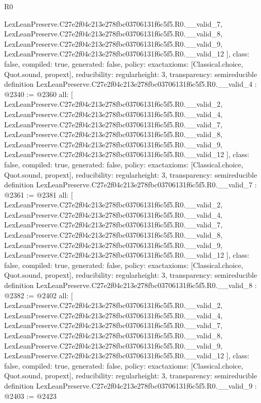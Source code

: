 \begin{lexlean}{R0}
\begin{coremodule}
{    LexLeanPreserve.C27e2f04c213e278fbc03706131f6c5f5.R0.__valid_7,
    LexLeanPreserve.C27e2f04c213e278fbc03706131f6c5f5.R0.__valid_8,
    LexLeanPreserve.C27e2f04c213e278fbc03706131f6c5f5.R0.__valid_9,
    LexLeanPreserve.C27e2f04c213e278fbc03706131f6c5f5.R0.__valid_12
  ],
  class: false,
  compiled: true,
  generated: false,
  policy: exact{axioms: [Classical.choice, Quot.sound, propext]},
  reducibility: regular{height: 3},
  transparency: semireducible
}
definition LexLeanPreserve.C27e2f04c213e278fbc03706131f6c5f5.R0.__valid_4 : @2340 := @2360 {
  all: [
    LexLeanPreserve.C27e2f04c213e278fbc03706131f6c5f5.R0.__valid_2,
    LexLeanPreserve.C27e2f04c213e278fbc03706131f6c5f5.R0.__valid_4,
    LexLeanPreserve.C27e2f04c213e278fbc03706131f6c5f5.R0.__valid_7,
    LexLeanPreserve.C27e2f04c213e278fbc03706131f6c5f5.R0.__valid_8,
    LexLeanPreserve.C27e2f04c213e278fbc03706131f6c5f5.R0.__valid_9,
    LexLeanPreserve.C27e2f04c213e278fbc03706131f6c5f5.R0.__valid_12
  ],
  class: false,
  compiled: true,
  generated: false,
  policy: exact{axioms: [Classical.choice, Quot.sound, propext]},
  reducibility: regular{height: 3},
  transparency: semireducible
}
definition LexLeanPreserve.C27e2f04c213e278fbc03706131f6c5f5.R0.__valid_7 : @2361 := @2381 {
  all: [
    LexLeanPreserve.C27e2f04c213e278fbc03706131f6c5f5.R0.__valid_2,
    LexLeanPreserve.C27e2f04c213e278fbc03706131f6c5f5.R0.__valid_4,
    LexLeanPreserve.C27e2f04c213e278fbc03706131f6c5f5.R0.__valid_7,
    LexLeanPreserve.C27e2f04c213e278fbc03706131f6c5f5.R0.__valid_8,
    LexLeanPreserve.C27e2f04c213e278fbc03706131f6c5f5.R0.__valid_9,
    LexLeanPreserve.C27e2f04c213e278fbc03706131f6c5f5.R0.__valid_12
  ],
  class: false,
  compiled: true,
  generated: false,
  policy: exact{axioms: [Classical.choice, Quot.sound, propext]},
  reducibility: regular{height: 3},
  transparency: semireducible
}
definition LexLeanPreserve.C27e2f04c213e278fbc03706131f6c5f5.R0.__valid_8 : @2382 := @2402 {
  all: [
    LexLeanPreserve.C27e2f04c213e278fbc03706131f6c5f5.R0.__valid_2,
    LexLeanPreserve.C27e2f04c213e278fbc03706131f6c5f5.R0.__valid_4,
    LexLeanPreserve.C27e2f04c213e278fbc03706131f6c5f5.R0.__valid_7,
    LexLeanPreserve.C27e2f04c213e278fbc03706131f6c5f5.R0.__valid_8,
    LexLeanPreserve.C27e2f04c213e278fbc03706131f6c5f5.R0.__valid_9,
    LexLeanPreserve.C27e2f04c213e278fbc03706131f6c5f5.R0.__valid_12
  ],
  class: false,
  compiled: true,
  generated: false,
  policy: exact{axioms: [Classical.choice, Quot.sound, propext]},
  reducibility: regular{height: 3},
  transparency: semireducible
}
definition LexLeanPreserve.C27e2f04c213e278fbc03706131f6c5f5.R0.__valid_9 : @2403 := @2423 {
}
\end{coremodule}
\end{lexlean}
